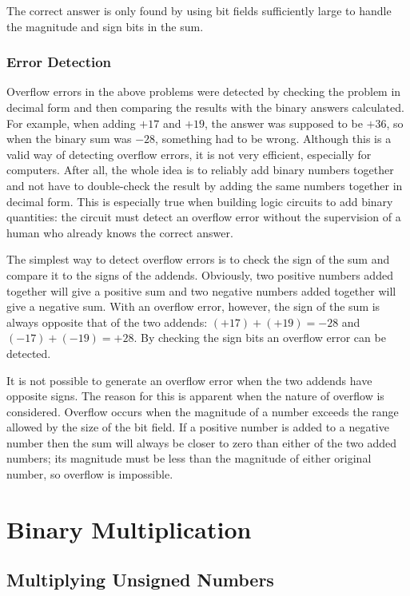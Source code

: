 The correct answer is only found by using bit fields sufficiently large to handle the magnitude and sign bits in the sum.

\subsubsection{Error Detection}
\label{MO:subsub:error_detection}

Overflow errors in the above problems were detected by checking the problem in decimal form and then comparing the results with the binary answers calculated. For example, when adding $ +17 $ and $ +19 $, the answer was supposed to be $ +36 $, so when the binary sum was $ -28 $, something had to be wrong. Although this is a valid way of detecting overflow errors, it is not very efficient, especially for computers. After all, the whole idea is to reliably add binary numbers together and not have to double-check the result by adding the same numbers together in decimal form. This is especially true when building logic circuits to add binary quantities: the circuit must detect an overflow error without the supervision of a human who already knows the correct answer.

The simplest way to detect overflow errors is to check the sign of the sum and compare it to the signs of the addends. Obviously, two positive numbers added together will give a positive sum and two negative numbers added together will give a negative sum. With an overflow error, however, the sign of the sum is always opposite that of the two addends: $ (+17) + (+19) = -28 $ and $ (-17) + (-19) = +28 $. By checking the sign bits an overflow error can be detected. 

It is not possible to generate an overflow error when the two addends have opposite signs. The reason for this is apparent when the nature of overflow is considered. Overflow occurs when the magnitude of a number exceeds the range allowed by the size of the bit field. If a positive number is added to a negative number then the sum will always be closer to zero than either of the two added numbers; its magnitude must be less than the magnitude of either original number, so overflow is impossible.

\section{Binary Multiplication}
\label{MO:sec:binary_multiplication}

\subsection{Multiplying Unsigned Numbers}
\label{MO:sub:multiplying_unsigned_numbers}


